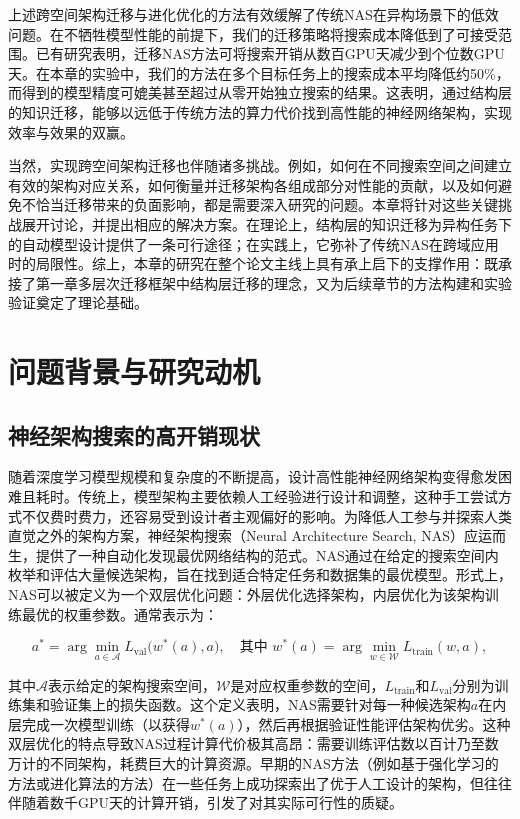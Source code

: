 \documentclass[../main.tex]{subfiles}
\begin{document}
上述跨空间架构迁移与进化优化的方法有效缓解了传统NAS在异构场景下的低效问题。在不牺牲模型性能的前提下，我们的迁移策略将搜索成本降低到了可接受范围。已有研究表明，迁移NAS方法可将搜索开销从数百GPU天减少到个位数GPU天。在本章的实验中，我们的方法在多个目标任务上的搜索成本平均降低约50\%，而得到的模型精度可媲美甚至超过从零开始独立搜索的结果。这表明，通过结构层的知识迁移，能够以远低于传统方法的算力代价找到高性能的神经网络架构，实现效率与效果的双赢。

当然，实现跨空间架构迁移也伴随诸多挑战。例如，如何在不同搜索空间之间建立有效的架构对应关系，如何衡量并迁移架构各组成部分对性能的贡献，以及如何避免不恰当迁移带来的负面影响，都是需要深入研究的问题。本章将针对这些关键挑战展开讨论，并提出相应的解决方案。在理论上，结构层的知识迁移为异构任务下的自动模型设计提供了一条可行途径；在实践上，它弥补了传统NAS在跨域应用时的局限性。综上，本章的研究在整个论文主线上具有承上启下的支撑作用：既承接了第一章多层次迁移框架中结构层迁移的理念，又为后续章节的方法构建和实验验证奠定了理论基础。

\section[\hspace{-2pt}问题背景与研究动机]{\heiti{}\hspace{-8pt}问题背景与研究动机}
\label{sec:chapter4_background}

\subsection{神经架构搜索的高开销现状}

随着深度学习模型规模和复杂度的不断提高，设计高性能神经网络架构变得愈发困难且耗时。传统上，模型架构主要依赖人工经验进行设计和调整，这种手工尝试方式不仅费时费力，还容易受到设计者主观偏好的影响。为降低人工参与并探索人类直觉之外的架构方案，神经架构搜索（Neural Architecture Search, NAS）应运而生，提供了一种自动化发现最优网络结构的范式。NAS通过在给定的搜索空间内枚举和评估大量候选架构，旨在找到适合特定任务和数据集的最优模型。形式上，NAS可以被定义为一个双层优化问题：外层优化选择架构，内层优化为该架构训练最优的权重参数。通常表示为：

\begin{equation}
	a^* = \arg\min_{a \in \mathcal{A}} L_{\text{val}}\big(w^*(a), a\big), \quad \text{其中 } w^*(a) = \arg\min_{w \in \mathcal{W}} L_{\text{train}}(w, a),
\end{equation}

其中$\mathcal{A}$表示给定的架构搜索空间，$\mathcal{W}$是对应权重参数的空间，$L_{\text{train}}$和$L_{\text{val}}$分别为训练集和验证集上的损失函数。这个定义表明，NAS需要针对每一种候选架构$a$在内层完成一次模型训练（以获得$w^*(a)$），然后再根据验证性能评估架构优劣。这种双层优化的特点导致NAS过程计算代价极其高昂：需要训练评估数以百计乃至数万计的不同架构，耗费巨大的计算资源。早期的NAS方法（例如基于强化学习的方法或进化算法的方法）在一些任务上成功探索出了优于人工设计的架构，但往往伴随着数千GPU天的计算开销，引发了对其实际可行性的质疑。
\end{document}
